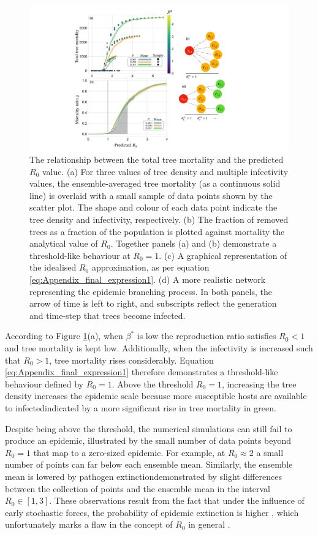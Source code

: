 \begin{figure}
    \centering
    \includegraphics[scale=0.44]{chapter5/figures/fig4-R0-analytic-vs-mortality.pdf}
    \caption{The relationship between the total tree mortality and the predicted $R_0$ value. (a) For three values of tree density and multiple infectivity values, the ensemble-averaged tree mortality (as a continuous solid line) is overlaid with a small sample of data points shown by the scatter plot. The shape and colour of each data point indicate the tree density and infectivity, respectively. (b) The fraction of removed trees as a fraction of the population is plotted against mortality the analytical value of $R_0$. Together panels (a) and (b) demonstrate a threshold-like behaviour at $R_0=1$. (c) A graphical representation of the idealised $R_0$ approximation, as per equation \ref{eq:Appendix_final_expression1}. (d) A more realistic network representing the epidemic branching process. In both panels, the arrow of time is left to right, and subscripts reflect the generation and time-step that trees become infected.}
    \label{fig:R0-vs-NLM-sims}
\end{figure}

According to Figure \ref{fig:R0-vs-NLM-sims}(a), when $\beta^*$ is low the reproduction ratio satisfies $R_0<1$ and tree mortality is kept low.
Additionally, when the infectivity is increased such that $R_0>1$,  tree mortality rises considerably.
Equation \ref{eq:Appendix_final_expression1} therefore demonstrates a threshold-like behaviour defined by $R_0=1$.
Above the threshold $R_0=1$, increasing the tree density increases the epidemic scale because more susceptible hosts are available to infected\textemdash indicated by a more significant rise in tree mortality in green.

Despite being above the threshold, the numerical simulations can still fail to produce an epidemic,
illustrated by the small number of data points beyond $R_0=1$ that map to a zero-sized epidemic. For example, at $R_0\approx 2$ a small number of points can far below each ensemble mean.
Similarly, the ensemble mean is lowered by pathogen extinction\textemdash demonstrated by slight differences between the collection of points and the ensemble mean in the interval $R_0 \in [1, 3]$.
These observations result from the fact that under the influence of early stochastic forces, the probability of epidemic extinction is higher \cite{perspectives-on-r0, R0-perc-ref}, which unfortunately marks a flaw in the concept of $R_0$ in general \cite{li2011failure}.

